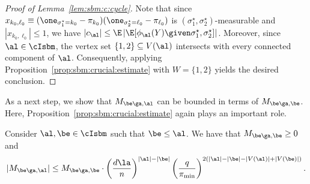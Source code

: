 \documentclass[11pt]{article}
\begin{document}
\begin{proof}[Proof of Lemma~\ref{lem:sbm:c:cycle}]
Note that since $x_{k_0,\ell_0}\equiv (\one_{\sigma^\star_1=k_0}-\pi_{k_0})(\one_{\sigma^\star_2=\ell_0}-\pi_{\ell_0})$ is $(\sigma^\star_1,\sigma^\star_2)$-measurable and $|x_{k_0,\ell_0}|\leq 1$, we have $|c_{\al}|\leq \E\left|\E[\phi_{\al}(Y)\given \sigma^\star_1,\sigma^\star_2]\right|$. Moreover, since $\al\in \cIsbm$, the vertex set $\{1,2\}\subseteq V(\al)$ intersects with every connected component of $\al$. Consequently, applying Proposition~\ref{prop:sbm:crucial:estimate} with $W=\{1,2\}$ yields the desired conclusion.  
\end{proof}
As a next step, we show that $M_{\be\ga,\al}$ can be bounded in terms of $M_{\be\ga,\be}$. Here, Proposition~\ref{prop:sbm:crucial:estimate} again plays an important role.
\begin{lemma}\label{lem:sbm:bound:M}
Consider $\al,\be\in \cIsbm$ such that $\be\le \al$. We have that $M_{\be\ga,\be}\geq 0$ and
\[
|M_{\be\ga,\al}|\le M_{\be\ga,\be}\cdot \left(\frac{d\la}{n}\right)^{|\al|-|\be|}  \left(\frac{q}{\pi_{\min}}\right)^{2(|\al|-|\be|-|V(\al)|+|V(\be)|)}.
\]
\end{lemma}
\end{document}
